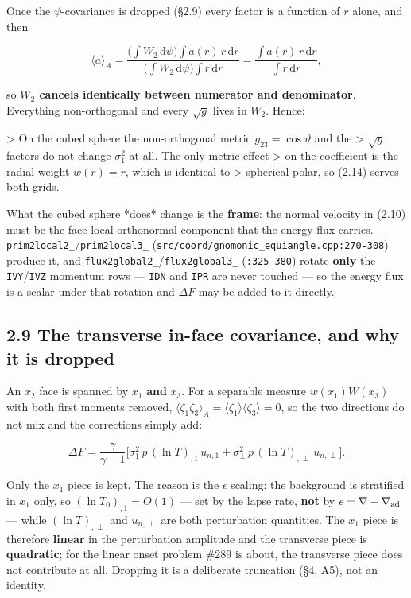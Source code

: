 \documentclass[11pt,a4paper]{article}
\begin{document}
Once the $\psi$-covariance is dropped (§2.9) every factor is a function of $r$
alone, and then

\begin{equation*}
\langle a\rangle_A
= \frac{\Big(\int W_2\,\mathrm{d}\psi\Big)\int a(r)\,r\,\mathrm{d}r}
       {\Big(\int W_2\,\mathrm{d}\psi\Big)\int r\,\mathrm{d}r}
= \frac{\int a(r)\,r\,\mathrm{d}r}{\int r\,\mathrm{d}r},
\end{equation*}

so \textbf{$W_2$ cancels identically between numerator and denominator}. Everything
non-orthogonal and every $\sqrt{g}$ lives in $W_2$. Hence:

> On the cubed sphere the non-orthogonal metric $g_{23}=\cos\vartheta$ and the
> $\sqrt{g}$ factors do not change $\sigma_1^2$ at all. The only metric effect
> on the coefficient is the radial weight $w(r)=r$, which is identical to
> spherical-polar, so (2.14) serves both grids.

What the cubed sphere *does* change is the \textbf{frame}: the normal velocity in
(2.10) must be the face-local orthonormal component that the energy flux
carries. \texttt{prim2local2\_}/\texttt{prim2local3\_}
(\texttt{src/coord/gnomonic\_equiangle.cpp:270-308}) produce it, and
\texttt{flux2global2\_}/\texttt{flux2global3\_} (\texttt{:325-380}) rotate \textbf{only} the \texttt{IVY}/\texttt{IVZ}
momentum rows — \texttt{IDN} and \texttt{IPR} are never touched — so the energy flux is a
scalar under that rotation and $\Delta F$ may be added to it directly.

\subsection*{2.9 The transverse in-face covariance, and why it is dropped}

An $x_2$ face is spanned by $x_1$ \textbf{and} $x_3$. For a separable measure
$w(x_1)W(x_3)$ with both first moments removed,
$\langle\zeta_1\zeta_3\rangle_A=\langle\zeta_1\rangle\langle\zeta_3\rangle=0$, so the
two directions do not mix and the corrections simply add:

\begin{equation*}
\Delta F = \frac{\gamma}{\gamma-1}\Big[
\sigma_1^2\,p\,(\ln T)_{,1}\,u_{n,1}
+ \sigma_\perp^2\,p\,(\ln T)_{,\perp}\,u_{n,\perp}\Big].
\tag{2.17}
\end{equation*}

Only the $x_1$ piece is kept. The reason is the $\epsilon$ scaling: the
background is stratified in $x_1$ only, so $(\ln T_0)_{,1}=O(1)$ — set by the
lapse rate, \textbf{not} by $\epsilon=\nabla-\nabla_{\rm ad}$ — while
$(\ln T)_{,\perp}$ and $u_{n,\perp}$ are both perturbation quantities. The
$x_1$ piece is therefore \textbf{linear} in the perturbation amplitude and the
transverse piece is \textbf{quadratic}; for the linear onset problem \#289 is about,
the transverse piece does not contribute at all. Dropping it is a deliberate
truncation (§4, A5), not an identity.
\end{document}
